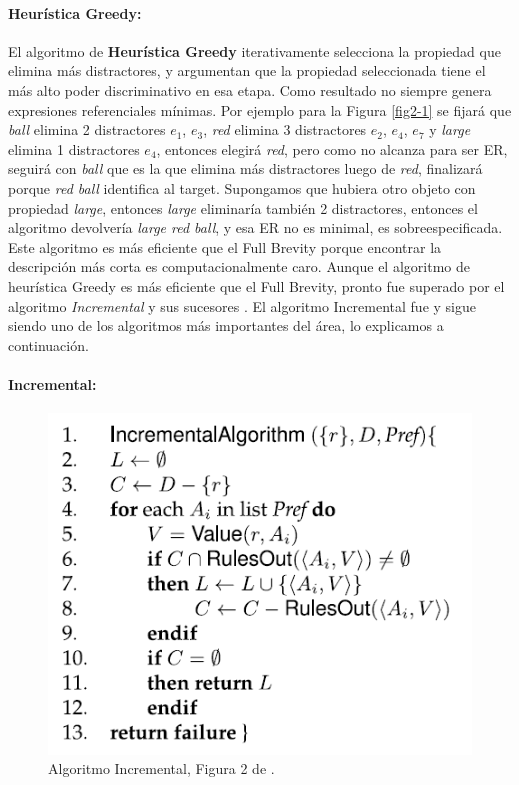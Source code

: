 \paragraph{Heur\'istica Greedy:} El algoritmo de {\bf Heur\'istica Greedy} \cite{greedy} iterativamente selecciona la propiedad que elimina m\'as distractores, y argumentan que la propiedad seleccionada tiene el m\'as alto poder discriminativo en esa etapa. Como resultado 
no siempre genera expresiones referenciales m\'inimas. Por ejemplo para la Figura \ref{fig2-1} se fijar\'a que {\it ball} elimina 2 distractores {$e_{1}$, $e_{3}$}, 
{\it red} elimina 3 distractores {$e_{2}$, $e_{4}$, $e_{7}$} y {\it large} elimina 1 distractores {$e_{4}$}, entonces elegir\'a {\it red}, 
pero como no alcanza para ser ER, seguir\'a con {\it ball} que es la que elimina m\'as distractores luego de {\it red}, finalizar\'a porque 
{\it red ball} identifica al target. Supongamos que hubiera otro objeto con propiedad {\it large}, entonces {\it large} eliminar\'ia tambi\'en  
 2 distractores, entonces el algoritmo devolver\'ia {\it large red ball}, y esa ER no es minimal, es sobreespecificada.
Este algoritmo es m\'as eficiente que el Full Brevity porque encontrar la descripci\'on m\'as corta es computacionalmente caro. Aunque el 
algoritmo de heur\'istica Greedy es m\'as eficiente que el Full Brevity, pronto fue superado por el algoritmo {\it Incremental} 
y sus sucesores \cite{C92-1038,Dale95computationalinterpretations}. El algoritmo Incremental fue y sigue siendo uno de los algoritmos 
m\'as importantes del \'area, lo explicamos a continuaci\'on. 

\paragraph{Incremental:}

\begin{figure}[ht]
\includegraphics[width=.5\textwidth]{images/algoritmoIncremental.png}
\caption{Algoritmo Incremental, Figura 2 de \protect\cite{survey}.}\label{algoritmoIncremental}

\end{figure}

